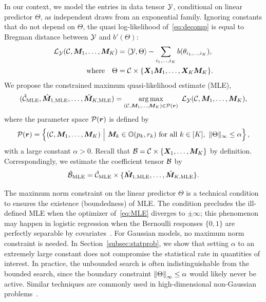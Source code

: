 \documentclass[12pt]{article}
\theoremstyle{definition}
\theoremstyle{definition}
\begin{document}
In our context, we model the entries in data tensor $\mathcal{Y}$, conditional on linear predictor $\Theta$, as independent draws from an exponential family. Ignoring constants that do not depend on $\Theta$, the quasi log-likelihood of~\eqref{eq:decomp} is equal to Bregman distance between $\mathcal{Y}$ and $b'(\Theta)$:
\begin{align}\label{eq:loglikelihood}
\mathcal{L}_{\mathcal{Y}}(\mathcal{C},\bm M_1,\ldots,\bm M_K)&=\langle \mathcal{Y}, \Theta \rangle - \sum_{i_1,\ldots,i_K} b(\theta_{i_1,\ldots,i_K}),\notag \\
 \text{where}\quad \Theta&=\mathcal{C}\times\{\bm X_1\bm M_1,\ldots,\bm X_K\bm M_K\}.
\end{align}
 We propose the constrained maximum quasi-likelihood estimate (MLE),
\begin{align} \label{eq:MLE} 
(\hat \tC_{\text{MLE}}, \hat \mM_{1,\text{MLE}},\ldots,\hat \mM_{K,\text{MLE}}) =\argmax_{(\tC,\mM_1,\ldots,\mM_K)\in \tP(\mr)} \ \tL_{\tY}(\tC,\mM_1,\ldots,\mM_K),
\end{align}
where the parameter space $\mathcal{P}(\bm{r})$ is defined by
\begin{equation}\label{eq:p}
\tP(\mr)=\left\{(\tC, \mM_1,\ldots,\mM_K) \ \Big| \ \mM_k\in\mathbb{O}(p_k,r_k)\ \text{for all }k\in[K],\  \mnormSize{}{\Theta}\leq \alpha \right\},
\end{equation}
with a large constant $\alpha>0$. Recall that $\mathcal{B}=\mathcal{C}\times\{\bm X_1,\ldots,\bm M_K\}$ by definition. Correspondingly, we estimate the coefficient tensor $\mathcal{B}$ by
\[
\hat {\mathcal{B}}_{\text{MLE}}=\hat {\mathcal{C}}_{\text{MLE}}\times\{\hat {\bm M}_{1,\text{MLE}},\ldots,\hat {\bm M}_{K,\text{MLE}}\}.
\] 

The maximum norm constraint on the linear predictor $\Theta$ is a technical condition to ensures the existence (boundedness) of MLE. 
{\color{blue}The condition precludes the ill-defined MLE when the optimizer of~\eqref{eq:MLE} diverges to $\pm \infty$; this phenomenon may happen in logistic regression when the Bernoulli responses $\{0,1\}$ are perfectly separable by covariates~\citep{wang2020learning}. For Gaussian models, no maximum norm constraint is needed. In Section~\ref{subsec:statprob}, we show that setting $\alpha$ to an extremely large constant does not compromise the statistical rate in quantities of interest. In practice, the unbounded search is often indistinguishable from the bounded search, since the boundary constraint $\left\lVert\Theta\right\rVert_{\infty} \leq \alpha$ would likely never be active. Similar techniques are commonly used in high-dimensional non-Gaussian problems~\citep{wang2020learning,han2020optimal}.}
\end{document}
